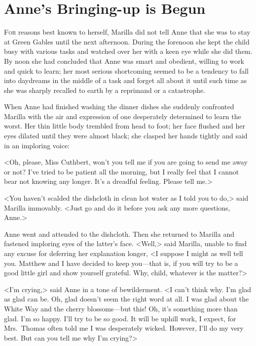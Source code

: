 \chapter{Anne's Bringing-up is Begun}

\lettrine{F}{or} reasons best known to herself, Marilla did not tell Anne that she was to stay at Green Gables until the next afternoon. During the forenoon she kept the child busy with various tasks and watched over her with a keen eye while she did them. By noon she had concluded that Anne was smart and obedient, willing to work and quick to learn; her most serious shortcoming seemed to be a tendency to fall into daydreams in the middle of a task and forget all about it until such time as she was sharply recalled to earth by a reprimand or a catastrophe.

When Anne had finished washing the dinner dishes she suddenly confronted Marilla with the air and expression of one desperately determined to learn the worst. Her thin little body trembled from head to foot; her face flushed and her eyes dilated until they were almost black; she clasped her hands tightly and said in an imploring voice:

<Oh, please, Miss Cuthbert, won't you tell me if you are going to send me away or not? I've tried to be patient all the morning, but I really feel that I cannot bear not knowing any longer. It's a dreadful feeling. Please tell me.>

<You haven't scalded the dishcloth in clean hot water as I told you to do,> said Marilla immovably. <Just go and do it before you ask any more questions, Anne.>

Anne went and attended to the dishcloth. Then she returned to Marilla and fastened imploring eyes of the latter's face. <Well,> said Marilla, unable to find any excuse for deferring her explanation longer, <I suppose I might as well tell you. Matthew and I have decided to keep you—that is, if you will try to be a good little girl and show yourself grateful. Why, child, whatever is the matter?>

<I'm crying,> said Anne in a tone of bewilderment. <I can't think why. I'm glad as glad can be. Oh, glad doesn't seem the right word at all. I was glad about the White Way and the cherry blossoms—but this! Oh, it's something more than glad. I'm so happy. I'll try to be so good. It will be uphill work, I expect, for Mrs.~Thomas often told me I was desperately wicked. However, I'll do my very best. But can you tell me why I'm crying?>

